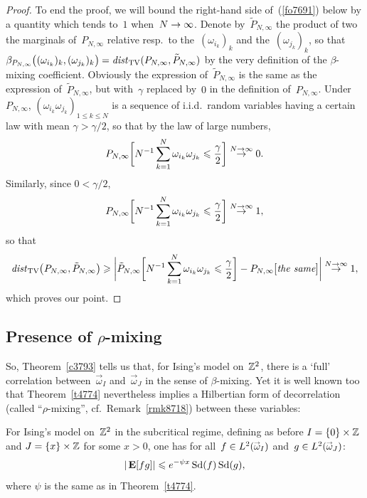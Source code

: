 \begin{proof}
To end the proof, we will bound the right-hand side of~(\ref{fo7691}) below
by a quantity which tends to~$1$ when~$N\to\infty$.
Denote by~$\tilde{P}_{N,\infty}$ the product of two the marginals
of~$P_{N,\infty}$ relative resp.\ to the~$(\omega_{i_k})_k$ and the~$(\omega_{j_k})_k$,
so that $\beta_{P_{N,\infty}} \big((\omega_{i_k})_k, (\omega_{j_k})_k\big)
= \dist_{\mathrm{TV}} (P_{N,\infty},\tilde{P}_{N,\infty})$
by the very definition of the $\beta$-mixing coefficient.
Obviously the expression of~$\tilde{P}_{N,\infty}$ is the same
as the expression of~$\tilde{P}_{N,\infty}$, but with~$\gamma$ replaced by~$0$ in the definition of~$P_{N,\infty}$.
Under $P_{N,\infty}$, $(\omega_{i_k}\omega_{j_k})_{1\leq k\leq N}$
is a sequence of i.i.d.\ random variables having a certain law with mean $\gamma > \gamma/2$,
so that by the law of large numbers,
\[ P_{N,\infty} \bigg[N^{-1}\sum_{k=1}^N \omega_{i_k}\omega_{j_k} \leq \frac{\gamma}{2} \bigg]
\stackrel{N\longto\infty}{\longto} 0 .\]
Similarly, since $0 < \gamma/2$,
\[ P_{N,\infty} \bigg[N^{-1} \sum_{k=1}^N \omega_{i_k}\omega_{j_k} \leq \frac{\gamma}{2} \bigg]
\stackrel{N\longto\infty}{\longto} 1 ,\]
so that
\[ \dist_{\mathrm{TV}} \big(P_{N,\infty},\tilde{P}_{N,\infty}\big) \geq
\bigg| \tilde{P}_{N,\infty}
\bigg[ N^{-1} \sum_{k=1}^N \omega_{i_k}\omega_{j_k} \leq \frac{\gamma}{2} \bigg] - P_{N,\infty}
\big[ \text{\it the same} \big] \bigg|
\stackrel{N\longto\infty}{\longto} 1 ,\]
which proves our point.
\end{proof}



\subsection{Presence of \texorpdfstring{$\rho$}{rho}-mixing}

So, Theorem~\ref{c3793} tells us that, for Ising's model on~$\mathbb{Z}^2$,
there is a `full' correlation between~$\vec\omega_{I}$ and~$\vec\omega_{J}$
in the sense of $\beta$-mixing.
Yet it is well known too that
Theorem~\ref{t4774} nevertheless implies a Hilbertian form of decorrelation
(called ``$\rho$-mixing'', cf.\ Remark~\ref{rmk8718}) between these variables:
%
\label{parc6177}\begin{Thm}\label{c6177}
For Ising's model on~$\mathbb{Z}^2$ in the subcritical regime,
defining as before $I = \{0\}\times\mathbb{Z}$ and $J = \{x\}\times\mathbb{Z}$ for some $x>0$,
one has for all~$f\in\ldb(\vec\omega_I)$ and~$g\in\ldb(\vec\omega_J)$:
\[\label{f2881} |\mathop{\smash{\mathbf{E}}}\nolimits[fg]| \leqslant e^{-\psi x} \operatorname{Sd}(f)\operatorname{Sd}(g) ,\]
where $\psi$ is the same as in Theorem~\ref{t4774}.
\end{Thm}

